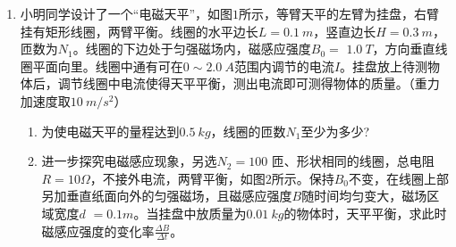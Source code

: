 \begin{enumerate}
\begin{enumerate}
\end{enumerate}
\begin{figure}[h!]
\flushright

\end{figure}






\newpage
\item
{}
小明同学设计了一个“电磁天平”，如图$ 1 $所示，等臂天平的左臂为挂盘，右臂挂有矩形线圈，两臂平衡。线圈的水平边长$ L=0.1\ m $，竖直边长$ H=0.3\ m $，匝数为$ N_{1} $。线圈的下边处于匀强磁场内，磁感应强度$ B_0= $ $ 1.0 \ T $，方向垂直线圈平面向里。线圈中通有可在$ 0 \sim 2.0 \ A $范围内调节的电流$ I $。挂盘放上待测物体后，调节线圈中电流使得天平平衡，测出电流即可测得物体的质量。（重力加速度取$ 10 \ m/s ^{2} $）
\begin{enumerate}
\renewcommand{\labelenumi}{\arabic{enumi}.}
\item
为使电磁天平的量程达到$ 0.5 \ kg $，线圈的匝数$ N_{1} $至少为多少?
\item 
进一步探究电磁感应现象，另选$ N_{2} =100 $ 匝、形状相同的线圈，总电阻$ R=10 \Omega $，不接外电流，两臂平衡，如图$ 2 $所示。保持$ B_{0} $不变，在线圈上部另加垂直纸面向外的匀强磁场，且磁感应强度$ B $随时间均匀变大，磁场区域宽度$ d $ $ =0.1m $。当挂盘中放质量为$ 0.01 \ kg $的物体时，天平平衡，求此时磁感应强度的变化率$ \frac{\Delta B}{\Delta t} $。



\end{enumerate}
\begin{figure}[h!]
\flushright
\begin{subfigure}{0.4\linewidth}
	\centering
	 
	\caption{}\label{}
\end{subfigure}
\begin{subfigure}{0.4\linewidth}
	\centering
	 
	\caption{}\label{}
\end{subfigure}
\end{figure}





\end{enumerate}
